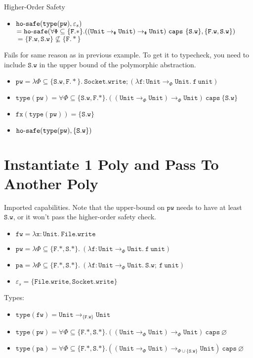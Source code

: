 \documentclass{llncs}
\newcommand{\keywadj}[1]{\mathtt{#1}}
\newcommand{\keyw}[1]{\keywadj{#1}~}
\newcommand{\kw}[1]{\keyw{ #1 }}
\newcommand{\kwa}[1]{\keywadj{ #1 }}
\newcommand{\hyphen}{\hbox{-}}
\newcommand{\Unit}[0]{ \kwa{Unit} }
\newcommand{\hosafe}[2]{ \kwa{ho \hyphen safe}(#1, #2) }
\begin{document}
\noindent
Higher-Order Safety
\begin{itemize}
	\item $\hosafe{\kwa{type(pw)}}{\varepsilon_s}$\\
		$= \hosafe{\kwa{\forall \Phi \subseteq \{F.*\}. ((Unit \rightarrow_{\Phi} Unit) \rightarrow_{\Phi} Unit) ~\kw{caps} \{S.w\}}}{\{\kwa{F.w, S.w}\}}$\\
		$= \{ \kwa{F.w, S.w} \} \not\subseteq \{ \kwa{F.*}\}$\\
\end{itemize}

\noindent
Fails for same reason as in previous example. To get it to typecheck, you need to include $\kwa{S.w}$ in the upper bound of the polymorphic abstraction.

\begin{itemize}
	\item $\kwa{pw = \lambda \Phi \subseteq \{\kwa{S.w, F.*} \}.~Socket.write; (\lambda f: Unit \rightarrow_{\Phi} Unit.  ~f~ unit)}$
	\item $\kwa{type(pw) = \forall \Phi \subseteq \{S.w, F.*\}. ((Unit \rightarrow_{\Phi} Unit) \rightarrow_{\Phi} Unit) ~\kw{caps} \{ \kwa{S.w} \}}$
	\item $\kwa{fx(type(pw)) = \{S.w\}}$
	\item $\hosafe{\kwa{type(pw)}}{\kwa{\{S.w\}}}$
\end{itemize}

\section{Instantiate 1 Poly and Pass To Another Poly}

Imported capabilities. Note that the upper-bound on $\kwa{pw}$ needs to have at least $\kwa{S.w}$, or it won't pass the higher-order safety check.

\begin{itemize}
	\item $\kwa{fw = \lambda x: Unit.~File.write}$
	\item $\kwa{pw = \lambda \Phi \subseteq \{ F.*, S.* \}.~ (\lambda f: Unit \rightarrow_{\Phi} \Unit. ~f ~unit)}$
	\item $\kwa{pa = \lambda \Phi \subseteq \{F.*, S.* \}.~(\lambda f: Unit \rightarrow_{\Phi} Unit.~S.w;~f~unit)}$
	\item $\varepsilon_s = \{\kwa{File.write, Socket.write}\}$
\end{itemize}

\noindent
Types:
\begin{itemize}
	\item $\kwa{type(fw) = \Unit \rightarrow_{\{F.w\}} \Unit}$
	\item $\kwa{type(pw) = \forall \Phi \subseteq \{F.*, S.*\}. ((Unit \rightarrow_{\Phi} Unit) \rightarrow_{\Phi} Unit) ~\kw{caps} \varnothing}$
	\item $\kwa{type(pa) = \forall \Phi \subseteq \{F.*, S.*\}. ((Unit \rightarrow_{\Phi} Unit) \rightarrow_{\Phi \cup \kwa{ \{ S.w \} }} Unit) ~\kw{caps} \varnothing}$
\end{itemize}
\end{document}
